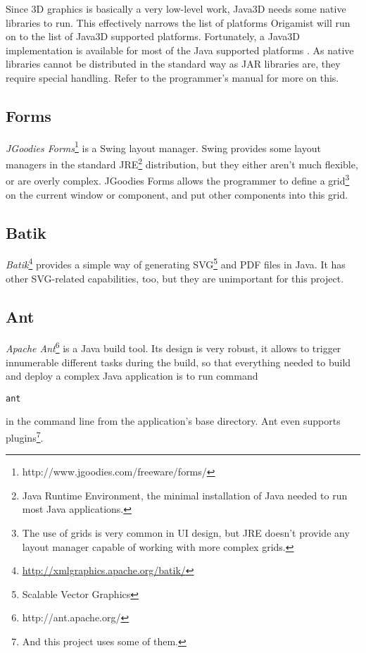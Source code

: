 Since 3D graphics is basically a very low-level work, Java3D needs some native
libraries to run. This effectively narrows the list of platforms Origamist will run on to the list of Java3D supported platforms. Fortunately, a Java3D implementation is available for most of the Java supported platforms \cite{java3dplatforms}.  As native libraries cannot be distributed in the standard way as JAR libraries are, they require special handling. Refer to the programmer's manual for more on this. %

\subsection{Forms}
\emph{JGoodies Forms}\footnote{http://www.jgoodies.com/freeware/forms/} is a Swing layout manager. Swing provides some layout managers in the standard JRE\footnote{Java Runtime Environment, the minimal installation of Java needed to run most Java applications.} distribution, but they either aren't much flexible, or are overly complex. JGoodies Forms allows the programmer to define a grid\footnote{The use of grids is very common in UI design, but JRE doesn't provide any layout manager capable of working with more complex grids.} on
the current window or component, and put other components into this grid.

\subsection{Batik}
\emph{Batik}\footnote{\url{http://xmlgraphics.apache.org/batik/}} provides a simple way of generating SVG\footnote{Scalable Vector Graphics} and PDF files in Java. It has other SVG-related capabilities, too, but they are unimportant for this project.

\subsection{Ant}
\emph{Apache Ant}\footnote{http://ant.apache.org/} is a Java build tool. Its design is very robust, it allows to trigger innumerable different tasks during the build, so that everything needed to build and deploy a complex Java application is to run command
\begin{verbatim}
ant
\end{verbatim}
in the command line from the application's base directory. Ant even supports
plugins\footnote{And this project uses some of them.}.
